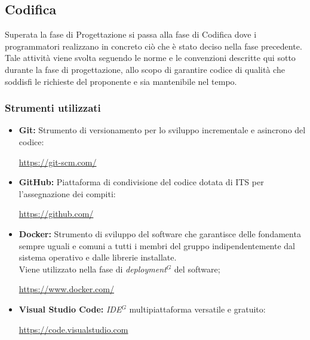 \nonstopmode
\subsection{Codifica}
Superata la fase di Progettazione si passa alla fase di Codifica dove i programmatori
realizzano in concreto ciò che è stato deciso nella fase precedente.
Tale attività viene svolta seguendo le norme e le convenzioni descritte qui sotto durante la fase di progettazione, allo
scopo di garantire codice di qualità che soddisfi le richieste del proponente e sia mantenibile nel tempo.

\subsubsection{Strumenti utilizzati}
    \begin{itemize}
    \item \textbf{Git:} Strumento di versionamento per lo sviluppo incrementale e asincrono del codice:
    \begin{center}
      \url{https://git-scm.com/}
    \end{center}
    \item \textbf{GitHub:} Piattaforma di condivisione del codice dotata di ITS per l'assegnazione dei compiti:
    \begin{center}
      \url{https://github.com/}
    \end{center}
    \item \textbf{Docker:} Strumento di sviluppo del software che garantisce delle fondamenta sempre uguali
      e comuni a tutti i membri del gruppo indipendentemente dal sistema operativo e dalle librerie installate. \\
      Viene utilizzato nella fase di \emph{deployment}$^{G}$ del software;
      \begin{center}
        \url{https://www.docker.com/}
      \end{center}
    \item \textbf{Visual Studio Code:} \emph{IDE}$^{G}$ multipiattaforma versatile e gratuito:
    \begin{center}
      \url{https://code.visualstudio.com}
    \end{center}
    \end{itemize}
